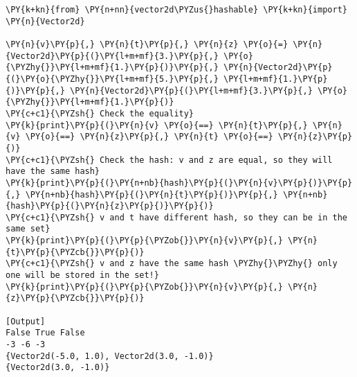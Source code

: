 \begin{Verbatim}[label=\makebox{\url{https://bitbucket.org/lbaldini/programming/src/tip/snippets/vector2d\_hashable\_test.py}},commandchars=\\\{\}]
\PY{k+kn}{from} \PY{n+nn}{vector2d\PYZus{}hashable} \PY{k+kn}{import} \PY{n}{Vector2d}
     
\PY{n}{v}\PY{p}{,} \PY{n}{t}\PY{p}{,} \PY{n}{z} \PY{o}{=} \PY{n}{Vector2d}\PY{p}{(}\PY{l+m+mf}{3.}\PY{p}{,} \PY{o}{\PYZhy{}}\PY{l+m+mf}{1.}\PY{p}{)}\PY{p}{,} \PY{n}{Vector2d}\PY{p}{(}\PY{o}{\PYZhy{}}\PY{l+m+mf}{5.}\PY{p}{,} \PY{l+m+mf}{1.}\PY{p}{)}\PY{p}{,} \PY{n}{Vector2d}\PY{p}{(}\PY{l+m+mf}{3.}\PY{p}{,} \PY{o}{\PYZhy{}}\PY{l+m+mf}{1.}\PY{p}{)}
\PY{c+c1}{\PYZsh{} Check the equality}
\PY{k}{print}\PY{p}{(}\PY{n}{v} \PY{o}{==} \PY{n}{t}\PY{p}{,} \PY{n}{v} \PY{o}{==} \PY{n}{z}\PY{p}{,} \PY{n}{t} \PY{o}{==} \PY{n}{z}\PY{p}{)}
\PY{c+c1}{\PYZsh{} Check the hash: v and z are equal, so they will have the same hash}
\PY{k}{print}\PY{p}{(}\PY{n+nb}{hash}\PY{p}{(}\PY{n}{v}\PY{p}{)}\PY{p}{,} \PY{n+nb}{hash}\PY{p}{(}\PY{n}{t}\PY{p}{)}\PY{p}{,} \PY{n+nb}{hash}\PY{p}{(}\PY{n}{z}\PY{p}{)}\PY{p}{)}
\PY{c+c1}{\PYZsh{} v and t have different hash, so they can be in the same set}
\PY{k}{print}\PY{p}{(}\PY{p}{\PYZob{}}\PY{n}{v}\PY{p}{,} \PY{n}{t}\PY{p}{\PYZcb{}}\PY{p}{)}
\PY{c+c1}{\PYZsh{} v and z have the same hash \PYZhy{}\PYZhy{} only one will be stored in the set!}
\PY{k}{print}\PY{p}{(}\PY{p}{\PYZob{}}\PY{n}{v}\PY{p}{,} \PY{n}{z}\PY{p}{\PYZcb{}}\PY{p}{)}

[Output]
False True False
-3 -6 -3
{Vector2d(-5.0, 1.0), Vector2d(3.0, -1.0)}
{Vector2d(3.0, -1.0)}
\end{Verbatim}